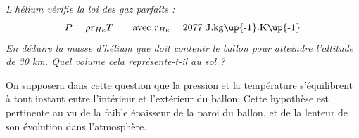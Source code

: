 \documentclass[10pt]{article}
\begin{document}
\subparagraph{}
\textit{L'hélium vérifie la loi des gaz parfaits : \[P=\rho r_{He} T \qquad \text{avec } r_{He}=2077\text{ J.kg\up{-1}.K\up{-1}}\]
En déduire la masse d'hélium que doit contenir le ballon pour atteindre l'altitude de 30 km. \newline Quel volume cela représente-t-il au sol ?}

\begin{rem}
On supposera dans cette question que la pression et la température s'équilibrent à tout instant entre l'intérieur et l'extérieur du ballon. Cette hypothèse est pertinente au vu de la faible épaisseur de la paroi du ballon, et de la lenteur de son évolution dans l'atmosphère.
\end{rem}
\end{document}
